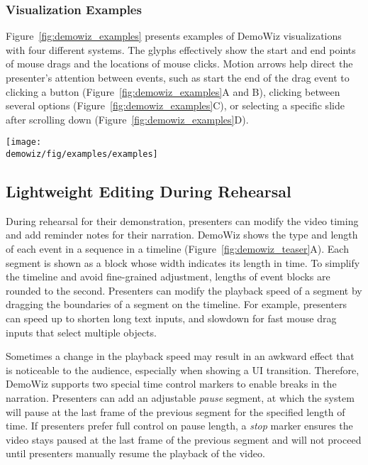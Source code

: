 
\subsubsection{Visualization Examples}
Figure~\ref{fig:demowiz_examples} presents examples of DemoWiz visualizations with four different systems. The glyphs effectively show the start and end points of mouse drags and the locations of mouse clicks. Motion arrows help direct the presenter's attention between events, such as start the end of the drag event to clicking a button (Figure~\ref{fig:demowiz_examples}A and B), clicking between several options (Figure~\ref{fig:demowiz_examples}C), or selecting a specific slide after scrolling down (Figure~\ref{fig:demowiz_examples}D).

\begin{figure*}[t]
  \centering
  \texttt{[image: \\demowiz/fig/examples/examples]}
  \caption{Examples of DemoWiz visualizations with four different systems and input event sequences.}
  \label{fig:demowiz_examples}
\end{figure*}


\subsection{Lightweight Editing During Rehearsal}
During rehearsal for their demonstration, presenters can modify the video timing and add reminder notes for their narration. DemoWiz shows the type and length of each event in a sequence in a timeline (Figure~\ref{fig:demowiz_teaser}A). Each segment is shown as a block whose width indicates its length in time. To simplify the timeline and avoid fine-grained adjustment, lengths of event blocks are rounded to the second. Presenters can modify the playback speed of a segment by dragging the boundaries of a segment on the timeline. For example, presenters can speed up to shorten long text inputs, and slowdown for fast mouse drag inputs that select multiple objects.

Sometimes a change in the playback speed may result in an awkward effect that is noticeable to the audience, especially when showing a UI transition. Therefore, DemoWiz supports two special time control markers to enable breaks in the narration. Presenters can add an adjustable \textit{pause} segment, at which the system will pause at the last frame of the previous segment for the specified length of time. If presenters prefer full control on pause length, a \textit{stop} marker ensures the video stays paused at the last frame of the previous segment and will not proceed until presenters manually resume the playback of the video.

